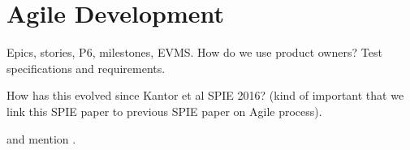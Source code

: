 \section{Agile Development}

Epics, stories, P6, milestones, EVMS.\label{sec:jira_ticket}
How do we use product owners?
Test specifications and requirements.

How has this evolved since Kantor et al SPIE 2016\cite{2016SPIE.9911E..0NK}? (kind of important that we link this SPIE paper to previous SPIE paper on Agile process).

and mention \cite{2014SPIE.9150E..1EG}.
